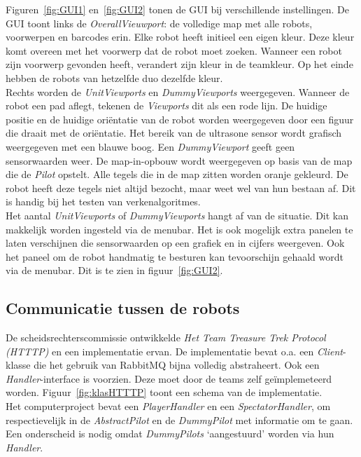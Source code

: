 \documentclass[tt3]{penoverslag}
\begin{document}
Figuren~\ref{fig:GUI1} en~\ref{fig:GUI2} tonen de GUI bij verschillende instellingen. De GUI toont links de \textit{OverallVieuwport}: de volledige map met alle robots, voorwerpen en barcodes erin. Elke robot heeft initieel een eigen kleur. Deze kleur komt overeen met het voorwerp dat de robot moet zoeken. Wanneer een robot zijn voorwerp gevonden heeft, verandert zijn kleur in de teamkleur. Op het einde hebben de robots van hetzelfde duo dezelfde kleur.\\

Rechts worden de \textit{UnitViewports} en \textit{DummyViewports} weergegeven. Wanneer de robot een pad aflegt, tekenen de \textit{Viewports} dit als een rode lijn. De huidige positie en de huidige ori\"entatie van de robot worden weergegeven door een figuur die draait met de ori\"entatie. Het bereik van de ultrasone sensor wordt grafisch weergegeven met een blauwe boog. Een \textit{DummyViewport} geeft geen sensorwaarden weer. De map-in-opbouw wordt weergegeven op basis van de map die de \textit{Pilot} opstelt. Alle tegels die in de map zitten worden oranje gekleurd. De robot heeft deze tegels niet altijd bezocht, maar weet wel van hun bestaan af. Dit is handig bij het testen van verkenalgoritmes.\\

Het aantal \textit{UnitViewports} of \textit{DummyViewports} hangt af van de situatie. Dit kan makkelijk worden ingesteld via de menubar. Het is ook mogelijk extra panelen te laten verschijnen die sensorwaarden op een grafiek en in cijfers weergeven. Ook het paneel om de robot handmatig te besturen kan tevoorschijn gehaald wordt via de menubar. Dit is te zien in figuur~\ref{fig:GUI2}.

\subsection{Communicatie tussen de robots}
\label{ssec:RabbMQ}
De scheidsrechterscommissie ontwikkelde \textit{Het Team Treasure Trek Protocol (HTTTP)} en een implementatie ervan. De implementatie bevat o.a. een \textit{Client}-klasse die het gebruik van RabbitMQ bijna volledig abstraheert. Ook een \textit{Handler}-interface is voorzien. Deze moet door de teams zelf ge\"implemeteerd worden. Figuur~\ref{fig:klasHTTTP} toont een schema van de implementatie.\\

Het computerproject bevat een \textit{PlayerHandler} en een \textit{SpectatorHandler}, om respectievelijk in de \textit{AbstractPilot} en de \textit{DummyPilot} met informatie om te gaan. Een onderscheid is nodig omdat \textit{DummyPilots} `aangestuurd' worden via hun \textit{Handler}.\\
\end{document}
